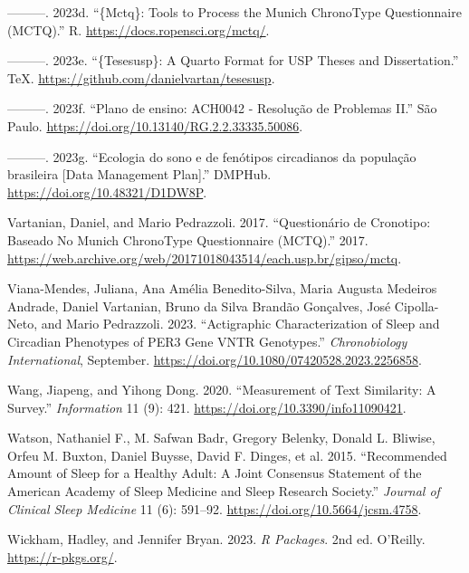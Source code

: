 \documentclass[
  12pt,
  a4paper,
  oneside]{tesesusp}
\newlength{\cslhangindent}
\newlength{\cslentryspacingunit} %
\newenvironment{CSLReferences}[2] %
 {%
  \setlength{\parindent}{0pt}
  \ifodd #1
  \let\oldpar\par
  \def\par{\hangindent=\cslhangindent\oldpar}
  \fi
  \setlength{\parskip}{#2\cslentryspacingunit}
 }%
 {}
\begin{document}
\begin{CSLReferences}{1}{0}
\leavevmode{}%
---------. 2023d. {``\{Mctq\}: Tools to Process the Munich ChronoType
Questionnaire (MCTQ).''} R. \url{https://docs.ropensci.org/mctq/}.

\leavevmode{}%
---------. 2023e. {``\{Tesesusp\}: A Quarto Format for USP Theses and
Dissertation.''} TeX. \url{https://github.com/danielvartan/tesesusp}.

\leavevmode{}%
---------. 2023f. {``Plano de ensino: ACH0042 - Resolução de Problemas
II.''} São Paulo. \url{https://doi.org/10.13140/RG.2.2.33335.50086}.

\leavevmode{}%
---------. 2023g. {``Ecologia do sono e de fenótipos circadianos da
população brasileira {[}Data Management Plan{]}.''} DMPHub.
\url{https://doi.org/10.48321/D1DW8P}.

\leavevmode{}%
Vartanian, Daniel, and Mario Pedrazzoli. 2017. {``Questionário de
Cronotipo: Baseado No Munich ChronoType Questionnaire (MCTQ).''} 2017.
\url{https://web.archive.org/web/20171018043514/each.usp.br/gipso/mctq}.

\leavevmode{}%
Viana-Mendes, Juliana, Ana Amélia Benedito-Silva, Maria Augusta Medeiros
Andrade, Daniel Vartanian, Bruno da Silva Brandão Gonçalves, José
Cipolla-Neto, and Mario Pedrazzoli. 2023. {``Actigraphic
Characterization of Sleep and Circadian Phenotypes of PER3 Gene VNTR
Genotypes.''} \emph{Chronobiology International}, September.
\url{https://doi.org/10.1080/07420528.2023.2256858}.

\leavevmode{}%
Wang, Jiapeng, and Yihong Dong. 2020. {``Measurement of Text Similarity:
A Survey.''} \emph{Information} 11 (9): 421.
\url{https://doi.org/10.3390/info11090421}.

\leavevmode{}%
Watson, Nathaniel F., M. Safwan Badr, Gregory Belenky, Donald L.
Bliwise, Orfeu M. Buxton, Daniel Buysse, David F. Dinges, et al. 2015.
{``Recommended Amount of Sleep for a Healthy Adult: A Joint Consensus
Statement of the American Academy of Sleep Medicine and Sleep Research
Society.''} \emph{Journal of Clinical Sleep Medicine} 11 (6): 591--92.
\url{https://doi.org/10.5664/jcsm.4758}.

\leavevmode{}%
Wickham, Hadley, and Jennifer Bryan. 2023. \emph{R Packages}. 2nd ed.
O'Reilly. \url{https://r-pkgs.org/}.


\end{CSLReferences}
\end{document}
